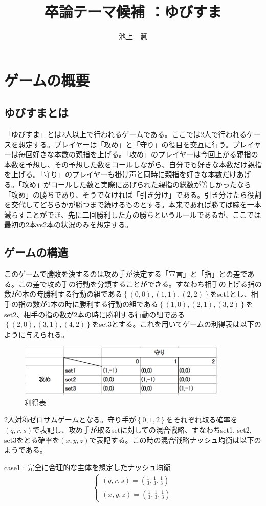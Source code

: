 \documentclass{jsarticle}
\begin{document}
\title{卒論テーマ候補 ：ゆびすま}
\author{池上　慧}
\maketitle

\section{ゲームの概要}
\subsection{ゆびすまとは}
「ゆびすま」とは2人以上で行われるゲームである。ここでは2人で行われるケースを想定する。プレイヤーは「攻め」と「守り」の役目を交互に行う。プレイヤーは毎回好きな本数の親指を上げる。「攻め」のプレイヤーは今回上がる親指の本数を予想し、その予想した数をコールしながら、自分でも好きな本数だけ親指を上げる。「守り」のプレイヤーも掛け声と同時に親指を好きな本数だけあげる。「攻め」がコールした数と実際にあげられた親指の総数が等しかったなら「攻め」の勝ちであり、そうでなければ「引き分け」である。引き分けたら役割を交代してどちらかが勝つまで続けるものとする。本来であれば勝てば腕を一本減らすことができ、先に二回勝利した方の勝ちというルールであるが、ここでは最初の2本vs2本の状況のみを想定する。

\subsection{ゲームの構造}
このゲームで勝敗を決するのは攻め手が決定する「宣言」と「指」との差である。この差で攻め手の行動を分類することができる。すなわち相手の上げる指の数が0本の時勝利する行動の組である$\left\{ (0,0), (1,1), (2,2)\right\}$をset1とし、相手の指の数が1本の時に勝利する行動の組である$\left\{ (1,0), (2,1), (3,2)\right\}$をset2、相手の指の数が2本の時に勝利する行動の組である$\left\{ (2,0), (3,1), (4,2)\right\}$をset3とする。これを用いてゲームの利得表は以下のように与えられる。
\begin{figure}[h]
    \centering
    \includegraphics[width=10cm]{pmat.png}
    \caption{利得表}
\end{figure}
2人対称ゼロサムゲームとなる。守り手が$\left\{ 0,1,2\right\}$をそれぞれ取る確率を$(q,r,s)$で表記し、攻め手が取るsetに対しての混合戦略、すなわちset1, set2, set3をとる確率を$(x,y,z)$で表記する。この時の混合戦略ナッシュ均衡は以下のようである。
\begin{itembox}[l]{case1 : 完全に合理的な主体を想定したナッシュ均衡}
    \begin{align}
    	\begin{cases}
		(q, r, s) = (\frac{1}{3}, \frac{1}{3}, \frac{1}{3})\\
		(x, y, z) = (\frac{1}{3}, \frac{1}{3}, \frac{1}{3})
	\end{cases}
    \end{align}
\end{itembox}
\end{document}
